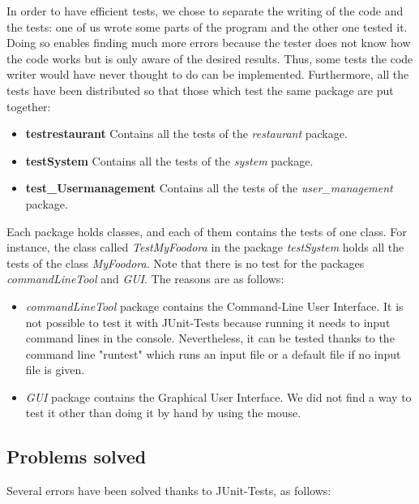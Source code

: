 In order to have efficient tests, we chose to separate the writing of the code and the tests: one of us wrote some parts of the program and the other one tested it. Doing so enables finding much more errors because the tester does not know how the code works but is only aware of the desired results. Thus, some tests the code writer would have never thought to do can be implemented.
Furthermore, all the tests have been distributed so that those which test the same package are put together:
\begin{itemize}
	\item{\textbf{testrestaurant}} Contains all the tests of the \textit{restaurant} package.
	\item{\textbf{testSystem}} Contains all the tests of the  \textit{system} package.
	\item{\textbf{test\_Usermanagement}} Contains all the tests of the \textit{user\_management} package.
\end{itemize}
Each package holds classes, and each of them contains the tests of one class. For instance, the class called \textit{TestMyFoodora} in the package \textit{testSystem} holds all the tests of the class \textit{MyFoodora}.  
Note that there is no test for the packages \textit{commandLineTool} and \textit{GUI}. The reasons are as follows:
\begin{itemize}
	\item{\textit{commandLineTool}} package contains the Command-Line User Interface. It is not possible to test it with JUnit-Tests because running it needs to input command lines in the console. Nevertheless, it can be tested thanks to the command line "runtest" which runs an input file or a default file if no input file is given.
	\item{\textit{GUI}} package contains the Graphical User Interface. We did not find a way to test it other than doing it by hand by using the mouse.
\end{itemize}

\subsection{Problems solved}
\label{sub:problems_solved}

Several errors have been solved thanks to JUnit-Tests, as follows:

